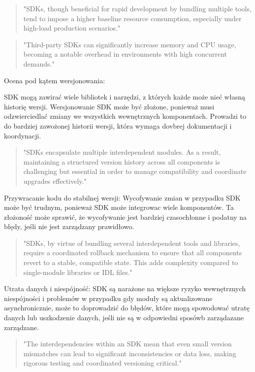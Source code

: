 \documentclass[runningheads,12pt]{llncs}
\begin{document}
\begin{quote}
    "SDKs, though beneficial for rapid development by bundling multiple tools, tend to impose a higher baseline resource consumption, especially under high-load production scenarios." ~\cite[para 3]{azure2020}
\end{quote}

\begin{quote}
    "Third-party SDKs can significantly increase memory and CPU usage, becoming a notable overhead in environments with high concurrent demands." ~\cite[p. 4]{ahmed2019impact}
\end{quote}

Ocena pod kątem wersjonowania:

SDK mogą zawirać wiele bibliotek i narzędzi, z których każde może nieć własną historię wersji. Wersjonowanie SDK może być  złożone, ponieważ musi odzwierciedlać zmiany we wszystkich wewnętrznych komponentach. Prowadzi to do bardziej zawożonej historii wersji, która wymaga dovbrej  dokumentacji i koordynacji.

\begin{quote}
    "SDKs encapsulate multiple interdependent modules. As a result, maintaining a structured version history across all components is challenging but essential in order to manage compatibility and coordinate upgrades effectively." ~\cite[para. 3]{azure2020}
\end{quote}

Przywracanie kodu do stabilnej wersji: Wycofywanie zmian w przypadku SDK może być trudnym, ponieważ SDK  może integrowac wiele komponentów. Ta złożoność może sprawić, że wycofywanie jest bardziej czasochłonne i podatny na błędy, jeśli nie jest zarządzany prawidłowo.

\begin{quote}
    "SDKs, by virtue of bundling several interdependent tools and libraries, require a coordinated rollback mechanism to ensure that all components revert to a stable, compatible state. This adds complexity compared to single-module libraries or IDL files." ~\cite[para. 3]{azure2020}
\end{quote}

Utrata danych i niespójność: SDK są narażone na większe ryzyko wewnętrznych niespójności i problemów w przypadku gdy moduły są aktualizowane asynchronicznie, może to doprowadzić do błędów, które mogą spowodować utratę danych lub uszkodzenie danych, jeśli nie są w odpowiedni sposówb zarządazane zarządzane.

\begin{quote}
    "The interdependencies within an SDK mean that even small version mismatches can lead to significant inconsistencies or data loss, making rigorous testing and coordinated versioning critical." ~\cite[para. 3]{azure2020}
\end{quote}
\end{document}
